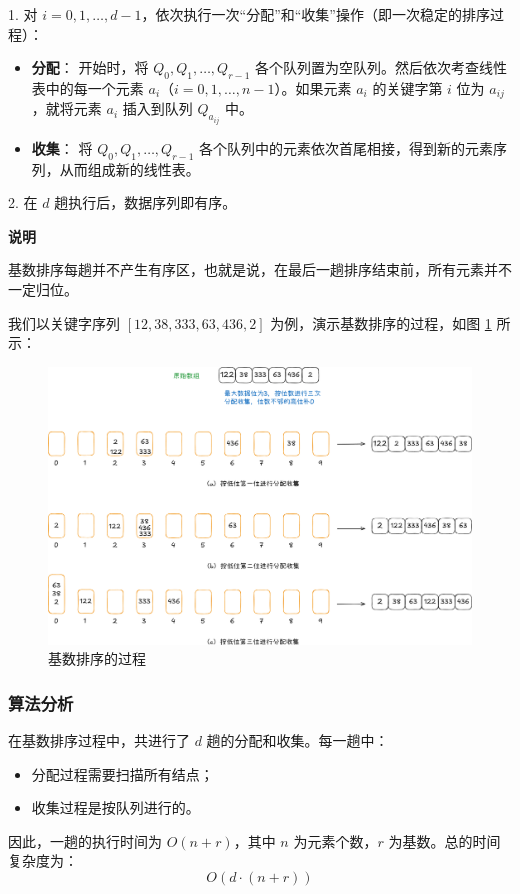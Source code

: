 \documentclass[lang=cn,newtx,10pt,scheme=chinese]{elegantbook}
\begin{document}
1. 对 $i = 0, 1, \dots, d-1$，依次执行一次“分配”和“收集”操作（即一次稳定的排序过程）：
   \begin{itemize}
     \item \textbf{分配}：  
       开始时，将 $Q_0, Q_1, \dots, Q_{r-1}$ 各个队列置为空队列。然后依次考查线性表中的每一个元素 $a_i$（$i = 0, 1, \dots, n-1$）。如果元素 $a_i$ 的关键字第 $i$ 位为 $a_{ij}$，就将元素 $a_i$ 插入到队列 $Q_{a_{ij}}$ 中。
     \item \textbf{收集}：  
       将 $Q_0, Q_1, \dots, Q_{r-1}$ 各个队列中的元素依次首尾相接，得到新的元素序列，从而组成新的线性表。
   \end{itemize}

2. 在 $d$ 趟执行后，数据序列即有序。



\textbf{说明}  

基数排序每趟并不产生有序区，也就是说，在最后一趟排序结束前，所有元素并不一定归位。

我们以关键字序列 $[12,38,333,63,436,2]$ 为例，演示基数排序的过程，如图 \ref{fig:radixSort} 所示：

\begin{figure}[h!]
    \centering
    \includegraphics[width=1\textwidth]{./figure/pdf/cropped/radixSort.pdf}
    \caption{基数排序的过程}
    \label{fig:radixSort}
\end{figure}

\subsubsection{算法分析}

在基数排序过程中，共进行了 $d$ 趟的分配和收集。每一趟中：
\begin{itemize}
  \item 分配过程需要扫描所有结点；
  \item 收集过程是按队列进行的。
\end{itemize}
因此，一趟的执行时间为 $O(n + r)$，其中 $n$ 为元素个数，$r$ 为基数。总的时间复杂度为：
\[
O(d \cdot (n + r))
\]
\end{document}
